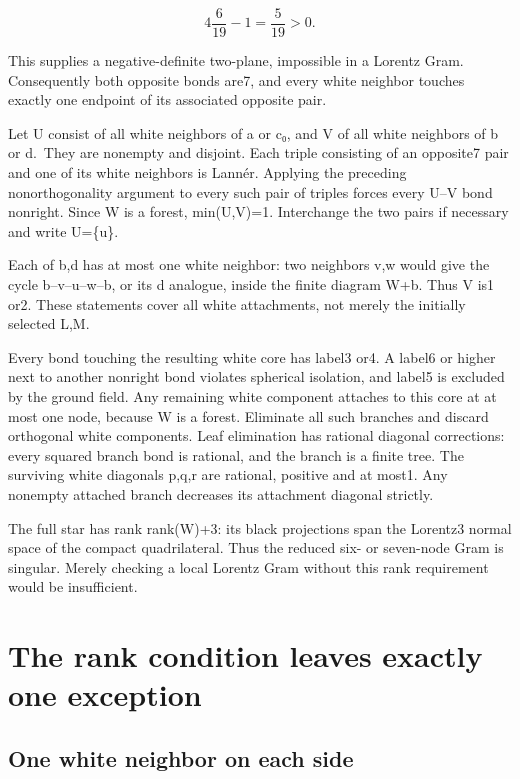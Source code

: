 \documentclass[
  10pt,
]{report}
\newcounter{none} %
\begin{document}
\[
 4\frac6{19}-1=\frac5{19}>0.
\]

This supplies a negative-definite two-plane, impossible in a Lorentz
Gram. Consequently both opposite bonds are7, and every white neighbor
touches exactly one endpoint of its associated opposite pair.

Let U consist of all white neighbors of a or c₀, and V of all white
neighbors of b or d.~They are nonempty and disjoint. Each triple
consisting of an opposite7 pair and one of its white neighbors is
Lannér. Applying the preceding nonorthogonality argument to every such
pair of triples forces every U--V bond nonright. Since W is a forest,
min(\textbar U\textbar,\textbar V\textbar)=1. Interchange the two pairs
if necessary and write U=\{u\}.

Each of b,d has at most one white neighbor: two neighbors v,w would give
the cycle b--v--u--w--b, or its d analogue, inside the finite diagram
W+b. Thus \textbar V\textbar{} is1 or2. These statements cover all white
attachments, not merely the initially selected L,M.

Every bond touching the resulting white core has label3 or4. A label6 or
higher next to another nonright bond violates spherical isolation, and
label5 is excluded by the ground field. Any remaining white component
attaches to this core at at most one node, because W is a forest.
Eliminate all such branches and discard orthogonal white components.
Leaf elimination has rational diagonal corrections: every squared branch
bond is rational, and the branch is a finite tree. The surviving white
diagonals p,q,r are rational, positive and at most1. Any nonempty
attached branch decreases its attachment diagonal strictly.

The full star has rank rank(W)+3: its black projections span the
Lorentz3 normal space of the compact quadrilateral. Thus the reduced
six- or seven-node Gram is singular. Merely checking a local Lorentz
Gram without this rank requirement would be insufficient.

\section{The rank condition leaves exactly one
exception}\label{the-rank-condition-leaves-exactly-one-exception}

\subsection{One white neighbor on each
side}\label{one-white-neighbor-on-each-side}
\end{document}
